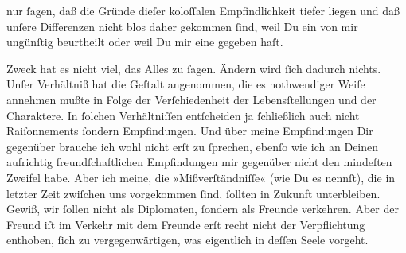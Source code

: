                nur{ }ſagen, daß die Gründe dieſer koloſſalen Empfindlichkeit tiefer liegen und daß
               unſere Differenzen nicht blos daher gekommen{ }ſind, weil Du ein \label{K_L03194-3v}\label{K_L03194-3} von mir ungünſtig beurtheilt  oder weil Du mir eine \label{K_L03194-4v}\label{K_L03194-4} gegeben haſt.\pend
           
\pstart
           Zweck hat es nicht viel, das Alles zu{ }ſagen. Ändern wird{ }ſich dadurch nichts. Unſer
               Verhältniß hat die Geſtalt angenommen, {\pb}die es
               nothwendiger Weiſe annehmen mußte in Folge der Verſchiedenheit der Lebensſtellungen
               und der Charaktere. In{ }ſolchen Verhältniſſen entſcheiden ja{ }ſchließlich auch nicht
               Raiſonnements{ }ſondern Empfindungen. Und über meine Empfindungen Dir gegenüber brauche
               ich wohl nicht erſt zu{ }ſprechen, ebenſo wie ich an Deinen aufrichtig\strikeout{\textcolor{gray}{e}} freundſchaftlichen Empfindungen
                   mir gegenüber nicht den mindeſten Zweifel habe.
               Aber ich meine, die »Mißverſtändniſſe« (wie Du es nennſt), die in letzter Zeit
               zwiſchen uns vorgekommen{ }ſind,{ }ſollten in Zukunft unterbleiben. Gewiß, wir{ }ſollen
               nicht als Diplomaten,{ }ſondern als Freunde verkehren. Aber der Freund iſt im Verkehr mit dem Freunde erſt recht nicht der Verpflichtung
               enthoben,{ }ſich zu vergegenwärtigen, was eigentlich in deſſen Seele vorgeht.\pend
           
